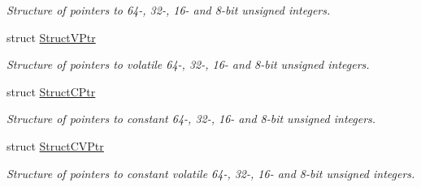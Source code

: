 \begin{DoxyCompactItemize}
\begin{DoxyCompactList}\small\item\em Structure of pointers to 64-\/, 32-\/, 16-\/ and 8-\/bit unsigned integers. \end{DoxyCompactList}\item 
struct \hyperlink{struct_struct_v_ptr}{Struct\-V\-Ptr}
\begin{DoxyCompactList}\small\item\em Structure of pointers to volatile 64-\/, 32-\/, 16-\/ and 8-\/bit unsigned integers. \end{DoxyCompactList}\item 
struct \hyperlink{struct_struct_c_ptr}{Struct\-C\-Ptr}
\begin{DoxyCompactList}\small\item\em Structure of pointers to constant 64-\/, 32-\/, 16-\/ and 8-\/bit unsigned integers. \end{DoxyCompactList}\item 
struct \hyperlink{struct_struct_c_v_ptr}{Struct\-C\-V\-Ptr}
\begin{DoxyCompactList}\small\item\em Structure of pointers to constant volatile 64-\/, 32-\/, 16-\/ and 8-\/bit unsigned integers. \end{DoxyCompactList}\end{DoxyCompactItemize}
